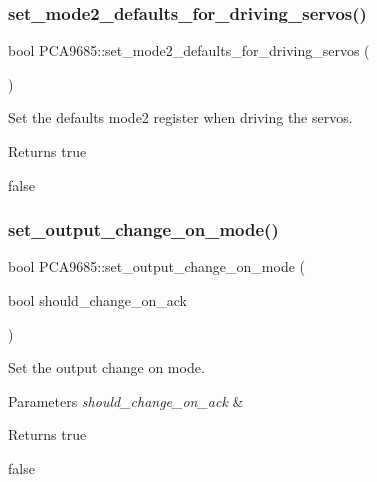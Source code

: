 \subsubsection{\texorpdfstring{set\+\_\+mode2\+\_\+defaults\+\_\+for\+\_\+driving\+\_\+servos()}{set\_mode2\_defaults\_for\_driving\_servos()}}
{\footnotesize\ttfamily bool P\+C\+A9685\+::set\+\_\+mode2\+\_\+defaults\+\_\+for\+\_\+driving\+\_\+servos (\begin{DoxyParamCaption}{ }\end{DoxyParamCaption})}



Set the defaults mode2 register when driving the servos. 

\begin{DoxyReturn}{Returns}
true 

false 
\end{DoxyReturn}
\mbox{\label{class_p_c_a9685_a067674fc92db60a2e72a91f94f98e8ce}} 
\subsubsection{\texorpdfstring{set\+\_\+output\+\_\+change\+\_\+on\+\_\+mode()}{set\_output\_change\_on\_mode()}}
{\footnotesize\ttfamily bool P\+C\+A9685\+::set\+\_\+output\+\_\+change\+\_\+on\+\_\+mode (\begin{DoxyParamCaption}\item[{bool}]{should\+\_\+change\+\_\+on\+\_\+ack }\end{DoxyParamCaption})}



Set the output change on mode. 


\begin{DoxyParams}{Parameters}
{\em should\+\_\+change\+\_\+on\+\_\+ack} & \\
\hline
\end{DoxyParams}
\begin{DoxyReturn}{Returns}
true 

false 
\end{DoxyReturn}
\mbox{\label{class_p_c_a9685_ae1df0135d003eb1b184e1433f6b245e0}} 

